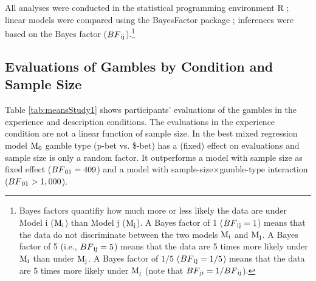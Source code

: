 \documentclass[a4paper, man, floatsintext]{apa6}
\title{}
\author{Jana B. Jarecki}
\date{15 September, 2019}
\let\rmarkdownfootnote\footnote%
\def\footnote{\protect\rmarkdownfootnote}
\begin{document}
All analyses were conducted in the statistical programming environment R
\citep{R2019}; linear models were compared using the BayesFactor package
\citep{BayesFactor}; inferences were based on the Bayes factor
(\(BF\textsubscript{ij}\)).\footnote{Bayes factors quantifiy how much more or less likely the data are under Model i ($\mathrm{M}\textsubscript{i}$) than Model j ($\mathrm{M}\textsubscript{j}$). A Bayes factor of 1 ($BF\textsubscript{ij} = 1$) means that the data do not discriminate between the two models $\mathrm{M}\textsubscript{i}$ and $\mathrm{M}\textsubscript{j}$. A Bayes factor of 5 (i.e., $BF\textsubscript{ij} = 5$) means that the data are 5 times more likely under $\mathrm{M}\textsubscript{i}$ than under $\mathrm{M}\textsubscript{j}$. A Bayes factor of $1/5$ ($BF\textsubscript{ij} = 1/5$) means that the data are 5 times more likely under $\mathrm{M}\textsubscript{j}$ (note that $BF\textsubscript{ji} = 1/BF\textsubscript{ij}$).}

\subsection{Evaluations of Gambles by Condition and Sample Size}

Table \ref{tab:meansStudy1} shows participants' evaluations of the
gambles in the experience and description conditions. The evaluations in
the experience condition are not a linear function of sample size. In
the best mixed regression model \(\mathrm{M}\textsubscript{0}\) gamble
type (p-bet vs. \$-bet) has a (fixed) effect on evaluations and sample
size is only a random factor. It outperforms a model with sample size as
fixed effect (\(BF\textsubscript{01} = 409\)) and a model with
sample-size\(\times\)gamble-type interaction
(\(BF\textsubscript{01} > 1,000\)).
\end{document}
